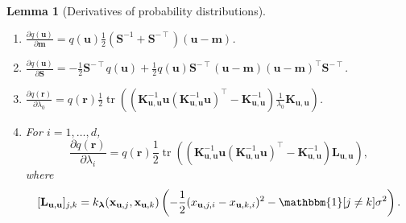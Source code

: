 \documentclass{article}
\newtheorem{lemma}[theorem]{Lemma}
\theoremstyle{definition}
\DeclareMathOperator{\tr}{tr}
\newcommand{\Kuu}{\mathbf{K}_{\mathbf{u},\mathbf{u}}}
\newcommand{\Luu}{\mathbf{L}_{\mathbf{u},\mathbf{u}}}
\begin{document}
\begin{lemma}[Derivatives of probability
  distributions] \label{lemma:derivatives}
  \begin{enumerate}
    \leavevmode
  \item $\frac{\partial q(\mathbf{u})}{\partial \mathbf{m}} =
    q(\mathbf{u})\frac{1}{2}(\mathbf{S}^{-1} +
    \mathbf{S}^{-\intercal})(\mathbf{u} - \mathbf{m})$.
  \item $\frac{\partial q(\mathbf{u})}{\partial \mathbf{S}} =
    -\frac{1}{2}\mathbf{S}^{-\intercal}q(\mathbf{u}) +
    \frac{1}{2}q(\mathbf{u})\mathbf{S}^{-\intercal}(\mathbf{u} -
    \mathbf{m})(\mathbf{u} - \mathbf{m})^\intercal\mathbf{S}^{-\intercal}$.
  \item $\frac{\partial q(\mathbf{r})}{\partial \lambda_0} =
    q(\mathbf{r})\frac{1}{2}\tr
    \left((\Kuu^{-1}\mathbf{u}(\Kuu^{-1}\mathbf{u})^\intercal - \Kuu^{-1})
      \frac{1}{\lambda_0}\Kuu \right)$.
  \item For $i = 1, \dots, d$,
    \[ \frac{\partial q(\mathbf{r})}{\partial \lambda_i} =
      q(\mathbf{r})\frac{1}{2}\tr
      \left((\Kuu^{-1}\mathbf{u}(\Kuu^{-1}\mathbf{u})^\intercal - \Kuu^{-1})
        \Luu \right), \]
    where
    \[ [\Luu]_{j,k} = k_{\bm\lambda}(\mathbf{x}_{\mathbf{u},j},
    \mathbf{x}_{\mathbf{u},k}) \left( -\frac{1}{2}(x_{\mathbf{u},j,i} -
      x_{\mathbf{u},k,i})^2 - \mathbbm{1}[j \ne k]\sigma^2 \right). \]
  \end{enumerate}
\end{lemma}
\end{document}
